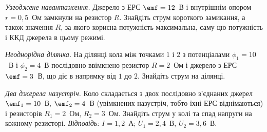 

\begin{problem}\label{prb:SourceMaxPower}
	\emph{Узгоджене навантаження.} Джерело з ЕРС $\emf=12$~В і внутрішнім опором $r=0{,}5$~Ом замкнули на резистор $R$. Знайдіть струм
	короткого замикання, а також значення $R$, за якого корисна потужність максимальна, саму цю потужність і ККД джерела в цьому режимі.
\end{problem}

\begin{problem}\label{prb:NonUniformSection}
	\emph{Неоднорідна ділянка.} На ділянці кола між точками $1$ і $2$ з потенціалами $\phi_1=10$~В і $\phi_2=4$~В послідовно ввімкнено
	резистор $R=2$~Ом і джерело з ЕРС $\emf=3$~В, що діє в напрямку від $1$ до $2$. Знайдіть струм на ділянці.
\end{problem}

\begin{problem}\label{prb:TwoSourcesOpposite}
	\emph{Два джерела назустріч.} Коло складається з двох послідовно з'єднаних джерел $\emf_1=10$~В, $\emf_2=4$~В (увімкнених назустріч,
	тобто їхні ЕРС віднімаються) і резисторів $R_1=2$~Ом, $R_2=3$~Ом. Знайдіть струм у колі та спад напруги на кожному резисторі.
	\emph{Відповідь:} $I=
	1{,}2$~А; $U_1=2{,}4$~В, $U_2=3{,}6$~В.
\end{problem}

